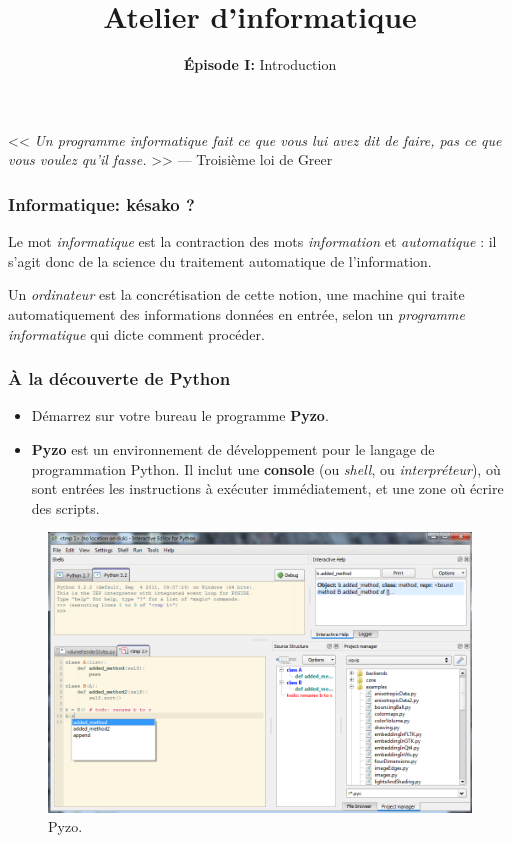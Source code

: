 \documentclass[10pt]{beamer}
\title{Atelier d'informatique}
\subtitle{\textbf{Épisode I:} Introduction}
\begin{document}
\begin{frame}
	\titlepage
	
	<< \textit{Un programme informatique fait ce que vous lui avez dit de faire, pas ce que vous voulez qu'il fasse.} >> — Troisième loi de Greer
\end{frame}

\begin{frame}
	\frametitle{Informatique: késako ?}
	
	Le mot \textit{informatique} est la contraction des mots \textit{information} et \textit{automatique} : il s'agit donc de la science du traitement automatique de l'information.
	\pause
	
	Un \textit{ordinateur} est la concrétisation de cette notion, une machine qui traite automatiquement des informations données en entrée, selon un \textit{programme informatique} qui dicte comment procéder.
\end{frame}

\begin{frame}[fragile]
	\frametitle{À la découverte de Python}
	
	\begin{itemize}
	\item<1-> Démarrez sur votre bureau le programme \textbf{Pyzo}.
	
	\item<2-> \textbf{Pyzo} est un environnement de développement pour le langage de programmation Python. Il inclut une \textbf{console} (ou \textit{shell}, ou \textit{interpréteur}), où sont entrées les instructions à exécuter immédiatement, et une zone où écrire des scripts.
	
	\end{itemize}
	\pause[3]
	
	\begin{figure}
		\centering
		\includegraphics[height=0.5\textheight]{screen_pyzo.png}
		\caption{Pyzo.}
	\end{figure}
	
	
\end{frame}
\end{document}
